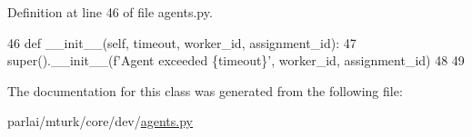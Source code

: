 Definition at line 46 of file agents.\+py.


\begin{DoxyCode}
46     \textcolor{keyword}{def }\_\_init\_\_(self, timeout, worker\_id, assignment\_id):
47         super().\_\_init\_\_(f\textcolor{stringliteral}{'Agent exceeded \{timeout\}'}, worker\_id, assignment\_id)
48 
49 
\end{DoxyCode}


The documentation for this class was generated from the following file\+:\begin{DoxyCompactItemize}
\item 
parlai/mturk/core/dev/\hyperlink{parlai_2mturk_2core_2dev_2agents_8py}{agents.\+py}\end{DoxyCompactItemize}
